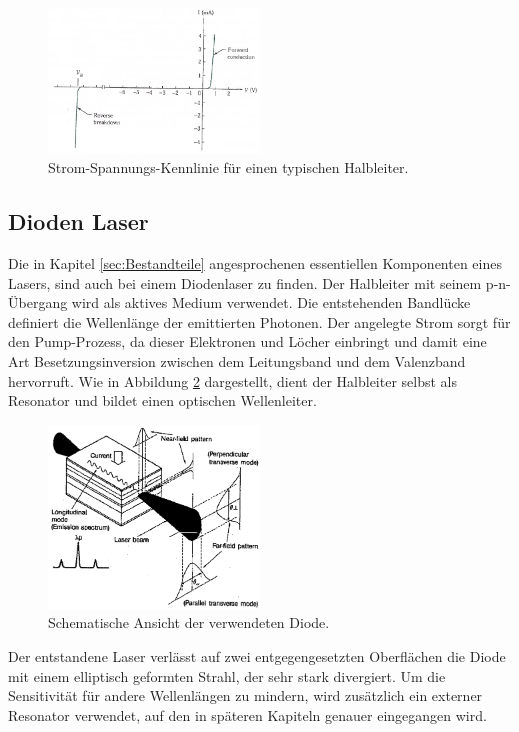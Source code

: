 \begin{figure}[H]
\centering
\includegraphics[width=0.5\textwidth]{ressources/IV.png}
\caption{Strom-Spannungs-Kennlinie für einen typischen Halbleiter. \cite{SZE}}
\label{sze4}
\end{figure}

\subsection{Dioden Laser}
Die in Kapitel \ref{sec:Bestandteile} angesprochenen essentiellen Komponenten eines Lasers, sind auch bei einem Diodenlaser zu finden. Der Halbleiter mit seinem p-n-Übergang wird als aktives Medium verwendet. Die entstehenden Bandlücke definiert die Wellenlänge der emittierten Photonen. Der angelegte Strom sorgt für den Pump-Prozess, da dieser Elektronen und Löcher einbringt und damit eine Art Besetzungsinversion zwischen dem Leitungsband und dem Valenzband hervorruft. Wie in Abbildung \ref{theo2} dargestellt, dient der Halbleiter selbst als Resonator und bildet einen optischen Wellenleiter. 

\begin{figure}[H]
\centering
\includegraphics[width=0.5\textwidth]{ressources/Diode.png}
\caption{Schematische Ansicht der verwendeten Diode. \cite{skript}}
\label{theo2}
\end{figure}

Der entstandene Laser verlässt auf zwei entgegengesetzten Oberflächen die Diode mit einem elliptisch geformten Strahl, der sehr stark divergiert. Um die Sensitivität für andere Wellenlängen zu mindern, wird zusätzlich ein externer Resonator verwendet, auf den in späteren Kapiteln genauer eingegangen wird.

